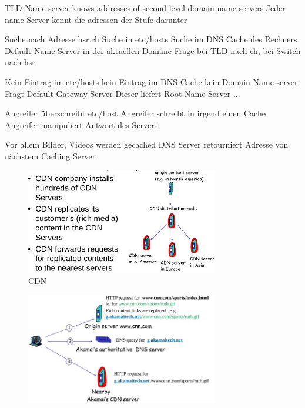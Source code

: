 \documentclass[ngerman,a4paper,12pt]{scrreprt}
\begin{document}
\ul
	\li TLD Name server knows addresses of second level domain name servers
	\li Jeder name Server kennt die adressen der Stufe darunter
\ulE

\ol
	\li Suche nach Adresse hsr.ch
	\li Suche in etc/hosts
	\li Suche im DNS Cache des Rechners
	\li Default Name Server in der aktuellen Domäne
	\li Frage bei TLD nach ch, bei Switch nach hsr
\olE

\ol
	\li Kein Eintrag im etc/hosts
	\li kein Eintrag im DNS Cache
	\li kein Domain Name server
	\li Fragt Default Gateway Server
	\li Dieser liefert Root Name Server
	\li ... 
\olE

\ol
	\li Angreifer überschreibt etc/host
	\li Angreifer schreibt in irgend einen Cache
	\li Angreifer manipuliert Antwort des Servers
\olE

\ul
	\li Vor allem Bilder, Videos werden gecached
	\li DNS Server retourniert Adresse von nächstem Caching Server
\ulE

\begin{figure}[H]
	\centering
	\includegraphics[width=0.75\textwidth]{img/V13.19.jpg}
	\caption{CDN}
	\label{}
\end{figure}

\begin{figure}[H]
	\centering
	\includegraphics[width=0.75\textwidth]{img/V13.18.jpg}
	\caption{}
	\label{}
\end{figure}
\end{document}
